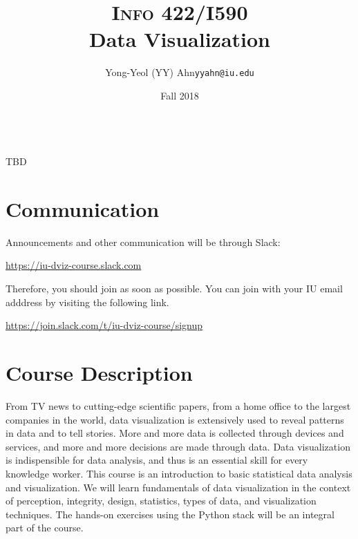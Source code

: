 \documentclass[11pt,article,oneside]{memoir} %
\makeatletter
\def\myauthor{Author}
\def\mytitle{Title}
\def\myemail{yyahn@iu.edu}
\def\myauthor{Yong-Yeol (YY) Ahn}
\def\mytitle{{\normalsize \textsc{Info} 422/I590} \\ \HUGE Data Visualization}
\makeatother
\begin{document}

\title{\LARGE \mytitle} %
\author{\Large\myauthor \newline \footnotesize\texttt{\noindent\myemail}}
\date{Fall 2018} %

\maketitle 

\vspace{-20pt}{\bfseries Assistant Instructors} \\ TBD %
\section{Communication} %

Announcements and other communication will be through Slack: 

\url{https://iu-dviz-course.slack.com}

Therefore, you should join as soon as possible. You can join with your IU email adddress by visiting the following link. 

\url{https://join.slack.com/t/iu-dviz-course/signup}

\section{Course Description}%

From TV news to cutting-edge scientific papers, from a home office to the
largest companies in the world, data visualization is extensively used to
reveal patterns in data and to tell stories. More and more data is collected
through devices and services, and more and more decisions are made through
data. Data visualization is indispensible for data analysis, and thus is an
essential skill for every knowledge worker.  This course is an introduction to
basic statistical data analysis and visualization.  We will learn fundamentals
of data visualization in the context of perception, integrity, design,
statistics, types of data, and visualization techniques.  The hands-on
exercises using the Python stack will be an integral part of the course. 
\end{document}
